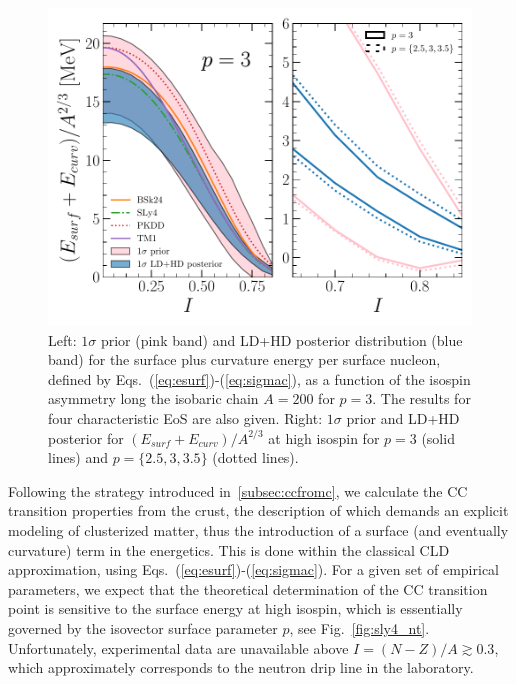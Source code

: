 \begin{figure}[!t]
  \begin{center}
    \includegraphics[width=0.9\linewidth]{figures/surf_bayes.pdf}
  \end{center}
  \caption[Prior and posterior distribution for the surface plus curvature
  energy per surface nucleon versus isospin asymmetry]{Left: $1\sigma$ prior
    (pink band) and LD+HD posterior distribution (blue band) for the surface 
    plus curvature energy per surface nucleon, defined by 
    Eqs.~(\ref{eq:esurf})-(\ref{eq:sigmac}), as a 
    function of the isospin asymmetry long the isobaric chain $A=200$ for
    $p=3$. The results for four characteristic EoS are also given. 
    Right: $1\sigma$ prior and LD+HD posterior for 
    $(E_{surf} + E_{curv})/A^{2/3}$ at high isospin for $p=3$ (solid lines) and 
  $p=\{2.5,3,3.5\}$ (dotted lines).}\label{fig:surf_bayes}
\end{figure}

Following the strategy introduced in~\ref{subsec:ccfromc}, we calculate the CC 
transition properties from the crust, the description of which demands an
explicit modeling of clusterized matter, thus the introduction of a surface
(and eventually curvature) term in the energetics. This is done 
within the classical CLD approximation, using
Eqs.~(\ref{eq:esurf})-(\ref{eq:sigmac}). For a given set of empirical
parameters, we expect that the theoretical determination of the CC transition 
point is sensitive to the surface energy at high isospin, which is essentially 
governed by the isovector surface parameter $p$, see Fig.~\ref{fig:sly4_nt}.
Unfortunately, experimental data are unavailable above $I = (N-Z)/A \gtrsim 
0.3$, which approximately corresponds to the neutron drip line in the
laboratory.

